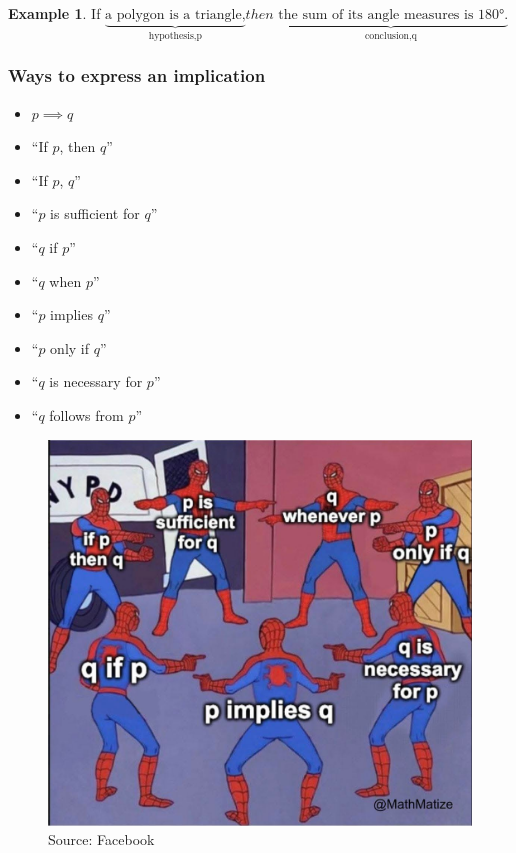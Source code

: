 \documentclass[
]{book}
\providecommand{\tightlist}{%
  \setlength{\itemsep}{0pt}\setlength{\parskip}{0pt}}
\theoremstyle{definition}
\theoremstyle{definition}
\newtheorem{example}{Example}[chapter]
\theoremstyle{definition}
\theoremstyle{definition}
\theoremstyle{remark}
\begin{document}
\begin{example}
\protect\hypertarget{exm:unnamed-chunk-22}{}\label{exm:unnamed-chunk-22}If \(\underbrace{\text{a polygon is a triangle,}}_\text{hypothesis,p}
 then
\underbrace{ \text{ the sum of its angle measures is 180°.}}_\text{conclusion,q}\)
\end{example}

\subsubsection{Ways to express an implication}\label{ways-to-express-an-implication}

\begin{itemize}
\tightlist
\item
  \(p \implies q\)
\item
  ``If \(p\), then \(q\)''
\item
  ``If \(p\), \(q\)''
\item
  ``\(p\) is sufficient for \(q\)''
\item
  ``\(q\) if \(p\)''
\item
  ``\(q\) when \(p\)''
\item
  ``\(p\) implies \(q\)''
\item
  ``\(p\) only if \(q\)''
\item
  ``\(q\) is necessary for \(p\)''
\item
  ``\(q\) follows from \(p\)''
\end{itemize}

\begin{figure}
\centering
\includegraphics[width=0.8\linewidth,height=\textheight,keepaspectratio]{fig/fig10.jpg}
\caption{Source: Facebook}
\end{figure}
\end{document}

